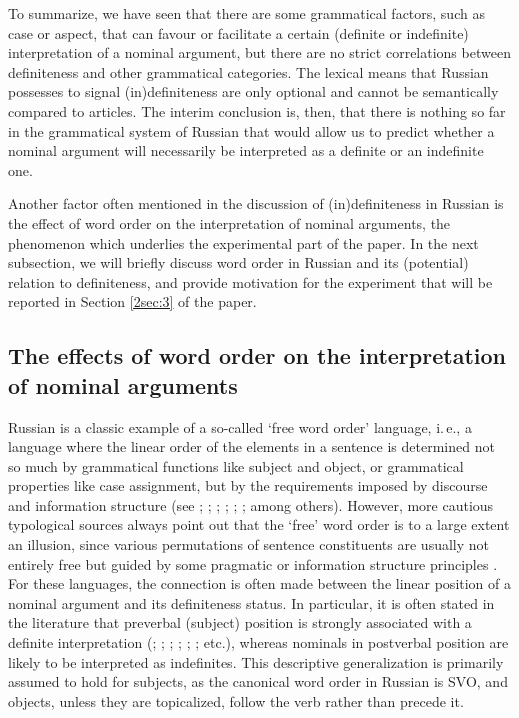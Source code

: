 \documentclass[output=paper]{langsci/langscibook}
\begin{document}
{
To summarize, we have seen that there are some grammatical factors, such as case or aspect, that can favour or facilitate a certain (definite or indefinite) interpretation of a nominal argument, but there are no strict correlations between definiteness and other grammatical categories. The lexical means that Russian possesses to signal (in)definiteness are only optional and cannot be semantically compared to articles. The interim conclusion is, then, that there is nothing so far in the grammatical system of Russian that would allow us to predict whether a nominal argument will necessarily be interpreted as a definite or an indefinite one. 
}

Another factor often mentioned in the discussion of (in)definiteness in Russian is the effect of word order on the interpretation of nominal arguments, the phenomenon which underlies the experimental part of the paper. In the next subsection, we will briefly discuss word order in Russian and its (potential) relation to definiteness, and provide motivation for the experiment that will be reported in Section \ref{2sec:3} of the paper. 

\subsection{The effects of word order on the interpretation of nominal arguments}\label{2sec:22}

Russian is a classic example of a so-called `free word order' language, i.\,e., a language where the linear order of the elements in a sentence is determined not so much by grammatical functions like subject and object, or grammatical properties like case assignment, but by the requirements imposed by discourse and information structure (see \citealt{mathesius:64}; \citealt{sgall:72}; \citealt{hajicova:74}; \citealt{isacenko:76}; \citealt{yokoyama:86}; \citealt{comrie:89}; among others). However, more cautious typological sources always point out that the `free' word order is to a large extent an illusion, since various permutations of sentence constituents are usually not entirely free but guided by some pragmatic or information structure principles \citep[see, for instance,][]{dryer:13}. For these languages, the connection is often made between the linear position of a nominal argument and its definiteness status. In particular, it is often stated in the literature that preverbal (subject) position is strongly associated with a definite interpretation (\citealt{pospelov:70}; \citealt{fursenko:70}; \citealt{kramsky:72}; \citealt{chvany:73}; \citealt{szwedek:74}; \citealt{topolinjska:09}; etc.), whereas nominals in postverbal position are likely to be interpreted as indefinites. This descriptive generalization is primarily assumed to hold for subjects, as the canonical word order in Russian is SVO, and objects, unless they are topicalized, follow the verb rather than precede it. 
\end{document}
